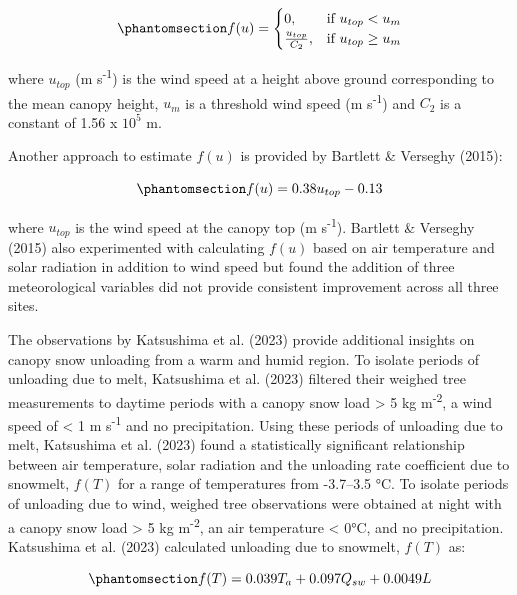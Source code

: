 \documentclass[
  letterpaper,
]{tex/uofsthesis-cs}
\begin{document}
\begin{equation}\phantomsection\label{eq-roesch-unload-v}{
f(u) = \begin{cases}
    0,& \text{if } u_{top} < u_m \\
    \frac{u_{top}}{C_2},              & \text{if }  u_{top} \ge u_m
\end{cases}
}\end{equation}

where \(u_{top}\) (m s\textsuperscript{-1}) is the wind speed at a
height above ground corresponding to the mean canopy height, \(u_m\) is
a threshold wind speed (m s\textsuperscript{-1}) and \(C_2\) is a
constant of 1.56 x \(10^5\) m.

Another approach to estimate \(f(u)\) is provided by Bartlett \&
Verseghy (2015):

\begin{equation}\phantomsection\label{eq-bartlett-unload-v}{
f(u) = 0.38u_{top} -0.13
}\end{equation}

where \(u_{top}\) is the wind speed at the canopy top (m
s\textsuperscript{-1}). Bartlett \& Verseghy (2015) also experimented
with calculating \(f(u)\) based on air temperature and solar radiation
in addition to wind speed but found the addition of three meteorological
variables did not provide consistent improvement across all three sites.

The observations by Katsushima et al. (2023) provide additional insights
on canopy snow unloading from a warm and humid region. To isolate
periods of unloading due to melt, Katsushima et al. (2023) filtered
their weighed tree measurements to daytime periods with a canopy snow
load \textgreater{} 5 kg m\textsuperscript{-2}, a wind speed of
\textless{} 1 m s\textsuperscript{-1} and no precipitation. Using these
periods of unloading due to melt, Katsushima et al. (2023) found a
statistically significant relationship between air temperature, solar
radiation and the unloading rate coefficient due to snowmelt, \(f(T)\)
for a range of temperatures from -3.7--3.5 °C. To isolate periods of
unloading due to wind, weighed tree observations were obtained at night
with a canopy snow load \textgreater{} 5 kg m\textsuperscript{-2}, an
air temperature \textless{} 0°C, and no precipitation. Katsushima et al.
(2023) calculated unloading due to snowmelt, \(f(T)\) as:

\begin{equation}\phantomsection\label{eq-kat-fmelt}{
f(T) = 0.039T_a+0.097Q_{sw}+0.0049L
}\end{equation}
\end{document}
